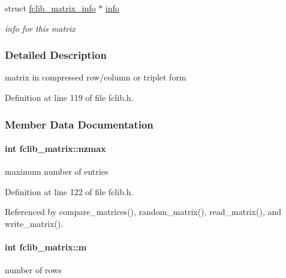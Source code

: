 \begin{DoxyCompactItemize}
struct \hyperlink{structfclib__matrix__info}{fclib\-\_\-matrix\-\_\-info} $\ast$ \hyperlink{structfclib__matrix_ac0af227334c5b0a13a3222c8f04add36}{info}
\begin{DoxyCompactList}\small\item\em info for this matrix \end{DoxyCompactList}\end{DoxyCompactItemize}


\subsubsection{Detailed Description}
matrix in compressed row/column or triplet form 

Definition at line 119 of file fclib.\-h.



\subsubsection{Member Data Documentation}
\hypertarget{structfclib__matrix_ad59323011143dc70ef74f4377279e0d0}{
\paragraph[{nzmax}]{\setlength{\rightskip}{0pt plus 5cm}int fclib\-\_\-matrix\-::nzmax}}\label{structfclib__matrix_ad59323011143dc70ef74f4377279e0d0}


maximum number of entries 



Definition at line 122 of file fclib.\-h.



Referenced by compare\-\_\-matrices(), random\-\_\-matrix(), read\-\_\-matrix(), and write\-\_\-matrix().

\hypertarget{structfclib__matrix_aaec2a835fcc339c3fb84227e2f7b861b}{
\paragraph[{m}]{\setlength{\rightskip}{0pt plus 5cm}int fclib\-\_\-matrix\-::m}}\label{structfclib__matrix_aaec2a835fcc339c3fb84227e2f7b861b}


number of rows 



